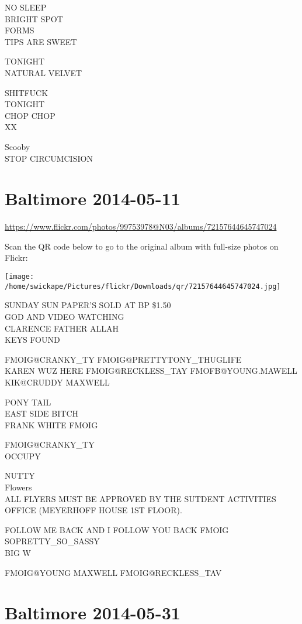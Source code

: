 \documentclass[10pt,letterpaper]{article}
\begin{document}
NO SLEEP\\
BRIGHT SPOT\\
FORMS\\
TIPS ARE SWEET

TONIGHT\\
NATURAL VELVET

SHITFUCK\\
TONIGHT\\
CHOP CHOP\\
XX

Scooby\\
STOP CIRCUMCISION
\pagebreak

\section*{Baltimore 2014-05-11}

\url{https://www.flickr.com/photos/99753978@N03/albums/72157644645747024}

Scan the QR code below to go to the original album with full-size photos on Flickr:

\texttt{[image: /home/swickape/Pictures/flickr/Downloads/qr/72157644645747024.jpg]}
\pagebreak

SUNDAY SUN PAPER'S SOLD AT BP \$1.50\\
GOD AND VIDEO WATCHING\\
CLARENCE FATHER ALLAH\\
KEYS FOUND

FMOIG@CRANKY\_TY FMOIG@PRETTYTONY\_THUGLIFE\\
KAREN WUZ HERE FMOIG@RECKLESS\_TAY FMOFB@YOUNG.MAWELL KIK@CRUDDY MAXWELL

PONY TAIL\\
EAST SIDE BITCH\\
FRANK WHITE FMOIG

FMOIG@CRANKY\_TY\\
OCCUPY

NUTTY\\
Flowers\\
ALL FLYERS MUST BE APPROVED BY THE SUTDENT ACTIVITIES OFFICE (MEYERHOFF HOUSE 1ST FLOOR).

FOLLOW ME BACK AND I FOLLOW YOU BACK FMOIG SOPRETTY\_SO\_SASSY\\
BIG W

FMOIG@YOUNG MAXWELL FMOIG@RECKLESS\_TAV
\pagebreak

\section*{Baltimore 2014-05-31}
\end{document}
